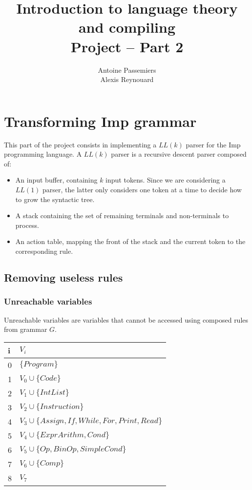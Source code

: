 \documentclass[12pt]{report}
\title{Introduction to language theory and compiling \\ Project -- Part 2}
\author{Antoine Passemiers \\ Alexis Reynouard}
\begin{document}
\maketitle
\tableofcontents
\thispagestyle{empty}
\pagebreak
\setcounter{page}{1}
\clearpage

\chapter{Transforming Imp grammar}

This part of the project consists in implementing a $LL(k)$ parser for the Imp programming language. A $LL(k)$ parser is a recursive descent parser composed of:

\begin{itemize}
\item An input buffer, containing $k$ input tokens. Since we are considering a $LL(1)$ parser, the latter only considers one token at a time to decide how to 
grow the syntactic tree.
\item A stack containing the set of remaining terminals and non-terminals to process.
\item An action table, mapping the front of the stack and the current token to the corresponding rule.
\end{itemize}

\section{Removing useless rules}

\subsection{Unreachable variables}

Unreachable variables are variables that cannot be accessed using composed rules from grammar $G$.

\begin{tabular}{|l p{35em}|} \hline
 i & $V_i$ \\ \hline
0 & $\{Program\}$ \\ \hline
1 & $V_0 \cup \{Code\}$ \\ \hline
2 & $V_1 \cup \{IntList\}$ \\ \hline
3 & $V_2 \cup \{Instruction\}$ \\ \hline
4 & $V_3 \cup \{Assign, If, While, For, Print, Read\}$ \\ \hline
5 & $V_4 \cup \{ExprArithm, Cond\}$ \\ \hline
6 & $V_5 \cup \{Op, BinOp, SimpleCond\}$ \\ \hline
7 & $V_6 \cup \{Comp\}$ \\ \hline
8 & $V_7$ \\ \hline
\end{tabular}
\end{document}
